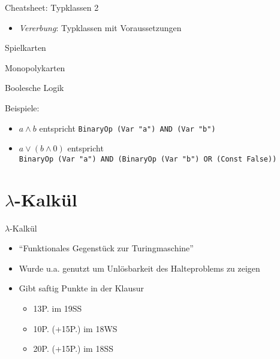 \documentclass{beamer}
\begin{document}
\begin{frame}{Cheatsheet: Typklassen 2}
  \begin{itemize}
    \item \emph{Vererbung}: Typklassen mit Voraussetzungen
  \end{itemize}

\end{frame}

\begin{frame}{Spielkarten}
\end{frame}

\begin{frame}{Monopolykarten}
\end{frame}

\begin{frame}{Boolesche Logik}

  \vfill

  Beispiele:
  \begin{itemize}
    \item $a \wedge b$ entspricht \texttt{BinaryOp (Var "{}a"{}) AND (Var "{}b"{})}
    \item $a \vee (b \wedge 0)$ entspricht\\
          \texttt{BinaryOp (Var "{}a"{}) AND (BinaryOp (Var "{}b"{}) OR (Const False))}
  \end{itemize}
\end{frame}

\section{$\lambda$-Kalkül}

\begin{frame}{$\lambda$-Kalkül}
	\begin{itemize}
                \item \enquote{Funktionales Gegenstück zur Turingmaschine}
		\item Wurde u.a. genutzt um Unlösbarkeit des Halteproblems zu zeigen
		\item Gibt saftig Punkte in der Klausur
		\begin{itemize}
			\item 13P. im 19SS
			\item 10P. (+15P.) im 18WS
			\item 20P. (+15P.) im 18SS
		\end{itemize}
	\end{itemize}
\end{frame}
\end{document}
